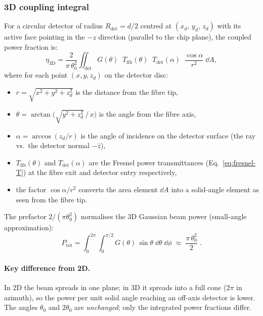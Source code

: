 \subsubsection{3D coupling integral}

For a circular detector of radius $R_\text{det} = d/2$ centred at
$(x_d,\, y_d,\, z_d)$ with its active face pointing in the $-z$
direction (parallel to the chip plane), the coupled power fraction is:
%
\begin{equation}\label{eq:eta3D}
  \eta_{3\text{D}}
  = \frac{2}{\pi\,\theta_0^2}
    \iint_\text{det}\!
    G(\theta)\;\;
    T_\text{fib}(\theta)\;\;
    T_\text{det}(\alpha)\;\;
    \frac{\cos\alpha}{r^2}\;
    \dd{A},
\end{equation}
%
where for each point $(x, y, z_d)$ on the detector disc:
%
\begin{itemize}
  \item $r = \sqrt{x^2 + y^2 + z_d^2}$ is the distance from the fibre tip,
  \item $\theta = \arctan\!\bigl(\sqrt{y^2 + z_d^2}\,\big/\,x\bigr)$ is the
        angle from the fibre axis,
  \item $\alpha = \arccos(z_d / r)$ is the angle of incidence on the
        detector surface (the ray vs.\ the detector normal $-\hat{z}$),
  \item $T_\text{fib}(\theta)$ and $T_\text{det}(\alpha)$ are the
        Fresnel power transmittances (Eq.~\ref{eq:fresnel-T}) at the fibre
        exit and detector entry respectively,
  \item the factor $\cos\alpha / r^2$ converts the area element $\dd{A}$
        into a solid-angle element as seen from the fibre tip.
\end{itemize}
%
The prefactor $2/(\pi\theta_0^2)$ normalises the 3D Gaussian beam power
(small-angle approximation):
%
\begin{equation}
  P_\text{tot}
  = \int_0^{2\pi}\!\!\int_0^{\pi/2}
    G(\theta)\,\sin\theta\;\dd{\theta}\;\dd{\phi}
  \;\approx\; \frac{\pi\,\theta_0^2}{2}\;.
\end{equation}

\paragraph{Key difference from 2D.}
In 2D the beam spreads in one plane; in 3D it spreads into a full cone
($2\pi$ in azimuth), so the power per unit solid angle reaching an
off-axis detector is lower.  The angles $\theta_0$ and $2\theta_0$ are
\emph{unchanged}; only the integrated power fractions differ.

